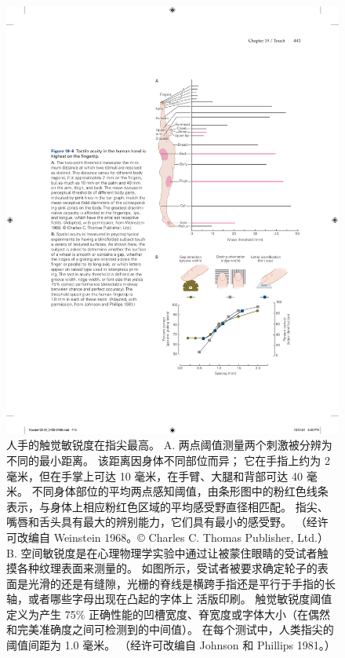 \begin{figure}[htbp]
	\centering
	\includegraphics[width=1.0\linewidth]{chap19/fig_19_6}
	\caption{人手的触觉敏锐度在指尖最高。
		A. 两点阈值测量两个刺激被分辨为不同的最小距离。 该距离因身体不同部位而异； 它在手指上约为 2 毫米，但在手掌上可达 10 毫米，在手臂、大腿和背部可达 40 毫米。
		不同身体部位的平均两点感知阈值，由条形图中的粉红色线条表示，与身体上相应粉红色区域的平均感受野直径相匹配。
		指尖、嘴唇和舌头具有最大的辨别能力，它们具有最小的感受野。 （经许可改编自 Weinstein 1968。© Charles C. Thomas Publisher, Ltd.）
		B. 空间敏锐度是在心理物理学实验中通过让被蒙住眼睛的受试者触摸各种纹理表面来测量的。
		如图所示，受试者被要求确定轮子的表面是光滑的还是有缝隙，光栅的脊线是横跨手指还是平行于手指的长轴，或者哪些字母出现在凸起的字体上 活版印刷。
		触觉敏锐度阈值定义为产生 75\% 正确性能的凹槽宽度、脊宽度或字体大小（在偶然和完美准确度之间可检测到的中间值）。
		在每个测试中，人类指尖的阈值间距为 1.0 毫米。 （经许可改编自 Johnson 和 Phillips 1981。）}
	\label{fig:19_6}
\end{figure}


